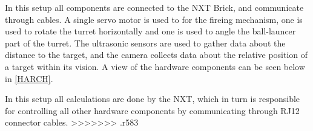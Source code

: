 In this setup all components are connected to the NXT Brick, and communicate
through cables. A single servo motor is used to for the fireing mechanism, one
is used to rotate the turret horizontally and one is used to angle the
ball-launcer part of the turret. The ultrasonic sensors are used to gather data
about the distance to the target, and the camera collects data about the
relative position of a target within its vision. A view of the hardware
components can be seen below in \autoref{HARCH}.


In this setup all calculations are done by the NXT, which in turn is responsible
for controlling all other hardware components by communicating through RJ12
connector cables.
>>>>>>> .r583
